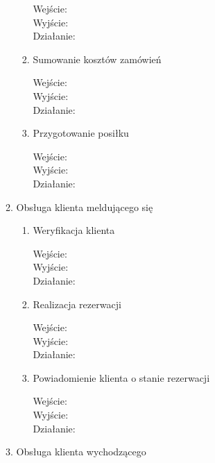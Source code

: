 \documentclass[a4paper, 11pt]{article}
\begin{document}
\begin{enumerate}[label*=\arabic*.]
\begin{enumerate}[label*=\arabic*.]
\begin{enumerate}[label*=\arabic*.]
\begin{description}
					\item[Wejście:]
					\item[Wyjście:]
					\item[Działanie:]
				\end{description}	
				\item Sumowanie kosztów zamówień
				\begin{description}
					\item[Wejście:]
					\item[Wyjście:]
					\item[Działanie:]
				\end{description}	
				\item Przygotowanie posiłku
				\begin{description}
					\item[Wejście:]
					\item[Wyjście:]
					\item[Działanie:]
				\end{description}	
			\end{enumerate}						
			\item Obsługa klienta meldującego się 
			\begin{enumerate}[label*=\arabic*.]
				\item Weryfikacja klienta
				\begin{description}
					\item[Wejście:]
					\item[Wyjście:]
					\item[Działanie:]
				\end{description}	
				\item Realizacja rezerwacji
				\begin{description}
					\item[Wejście:]
					\item[Wyjście:]
					\item[Działanie:]
				\end{description}	
				\item Powiadomienie klienta o stanie rezerwacji
				\begin{description}
					\item[Wejście:]
					\item[Wyjście:]
					\item[Działanie:]
				\end{description}	
			\end{enumerate}									
			\item Obsługa klienta wychodzącego
			\begin{enumerate}[label*=\arabic*.]

\end{enumerate}
\end{enumerate}
\end{enumerate}
\end{document}
